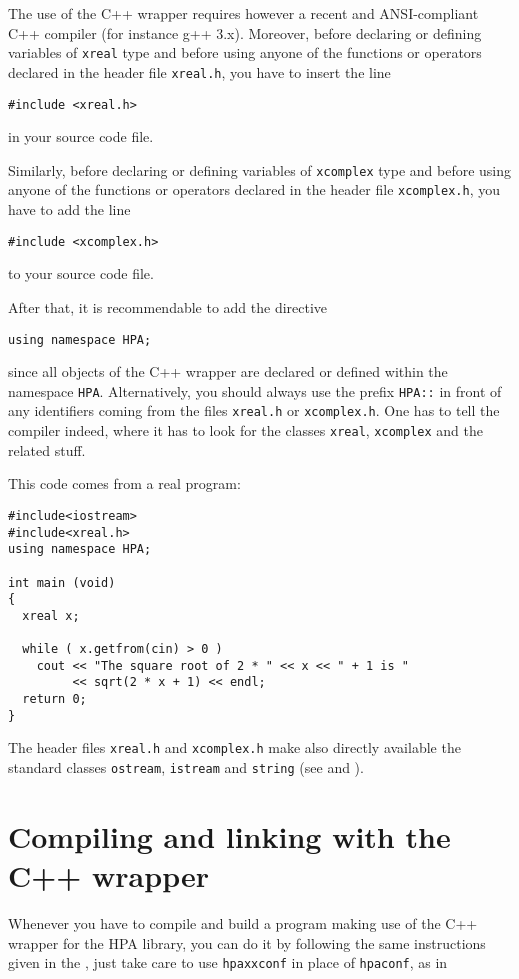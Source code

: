 \documentclass{article}
\begin{document}
The use of the C++ wrapper requires however a recent
and ANSI-compliant C++ compiler (for instance g++ 3.x).
Moreover, before declaring or defining variables of \texttt{xreal}
type and before using anyone of the functions or operators 
declared in the header file \texttt{xreal.h}, you have to insert the line

\begin{verbatim}
#include <xreal.h>
\end{verbatim}
in your source code file.

Similarly, before declaring or defining variables of \texttt{xcomplex}
type and before using anyone of the functions or operators
declared in the header file \texttt{xcomplex.h}, you have to add the line

\begin{verbatim}
#include <xcomplex.h>
\end{verbatim}
to your source code file.

After that, it is recommendable to add the directive

\begin{verbatim}
using namespace HPA;
\end{verbatim}
since all objects of the C++ wrapper are declared
or defined within the namespace \texttt{HPA}.
Alternatively, you should always use the prefix
\texttt{HPA::} in front of any identifiers coming
from the files \texttt{xreal.h} or \texttt{xcomplex.h}.
One has to tell the compiler indeed, where it has to look for
the classes \texttt{xreal}, \texttt{xcomplex} and the related stuff.

This code comes from a real program:

\begin{verbatim}
#include<iostream>
#include<xreal.h>
using namespace HPA;

int main (void)
{
  xreal x;

  while ( x.getfrom(cin) > 0 )
    cout << "The square root of 2 * " << x << " + 1 is " 
         << sqrt(2 * x + 1) << endl;
  return 0;
}
\end{verbatim}
The header files \texttt{xreal.h} and
\texttt{xcomplex.h} make also directly available the standard classes
\texttt{ostream}, \texttt{istream} and \texttt{string}
(see 
 and ). 


\hypertarget{toc17}{}
\section{Compiling and linking with the C++ wrapper}
Whenever you have to compile and build a program making use
of the C++ wrapper for the HPA library, you can do it by following
the same instructions given in the ,
just take care to use \texttt{hpaxxconf} in place of
\texttt{hpaconf}, as in
\end{document}
